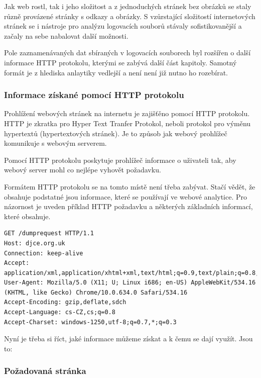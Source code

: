 \documentclass[bc,female,java,dept456]{diploma}						%
\begin{document}
Jak web rostl, tak i jeho složitost a z jednoduchých stránek bez obrázků se staly různě provázené stránky s odkazy a obrázky. S vzůrstající složitostí internetových stránek se i nástroje pro analýzu logovacích souborů stávaly sofistikovanější a začaly na sebe nabalovat další možnosti.

Pole zaznamenávaných dat sbíraných v logovacích souborech byl rozšířen o další informace HTTP protokolu, kterými se zabývá další část kapitoly. Samotný formát je z hlediska anlaytiky vedlejší a není není již nutno ho rozebírat.





  
\subsubsection{Informace získané pomocí HTTP protokolu}

Prohlížení webových stránek na internetu je zajišťěno pomocí HTTP protokolu. HTTP je zkratka pro Hyper Text Tranfer Protokol, neboli protokol pro výměnu hypertextů (hypertextových stránek). Je to způsob jak webový prohlížeč komunikuje s webovým serverem.

Pomocí HTTP protokolu poskytuje prohlížeč informace o uživateli tak, aby webový server mohl co nejlépe vyhovět požadavku.

Formátem HTTP protokolu se na tomto místě není třeba zabývat. Stačí vědět, že obsahuje podstatné jsou informace, které se používají ve webové analytice. Pro názornost je uveden příklad HTTP požadavku a některých základních informací, které obsahuje.

\bigskip

\begin{lstlisting}[label=src:Plain,caption=Ukázka HTTP požadavku]
GET /dumprequest HTTP/1.1
Host: djce.org.uk
Connection: keep-alive
Accept: application/xml,application/xhtml+xml,text/html;q=0.9,text/plain;q=0.8,image/png,*/*;q=0.5
User-Agent: Mozilla/5.0 (X11; U; Linux i686; en-US) AppleWebKit/534.16 (KHTML, like Gecko) Chrome/10.0.634.0 Safari/534.16
Accept-Encoding: gzip,deflate,sdch
Accept-Language: cs-CZ,cs;q=0.8
Accept-Charset: windows-1250,utf-8;q=0.7,*;q=0.3
\end{lstlisting}

Nyní je třeba si říct, jaké informace můžeme získat a k čemu se dají využít. Jsou to:

\subsubsection{Požadovaná stránka}
\end{document}
